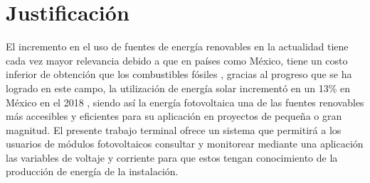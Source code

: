 \section{Justificación}
El incremento en el uso de fuentes de energía renovables en la actualidad tiene cada vez mayor relevancia debido a que en países como México, tiene un costo inferior de obtención que los combustibles fósiles \citep{Not1}, gracias al progreso que se ha logrado en este campo, la utilización de energía solar incrementó en un 13\% en México en el 2018 \citep{Not2}, siendo así la energía fotovoltaica una de las fuentes renovables más accesibles y eficientes para su aplicación en proyectos de pequeña o gran magnitud.
El presente trabajo terminal ofrece un sistema que permitirá a los usuarios de módulos fotovoltaicos consultar y monitorear mediante una aplicación las variables de voltaje y corriente para que estos tengan conocimiento de la producción de energía de la instalación.
